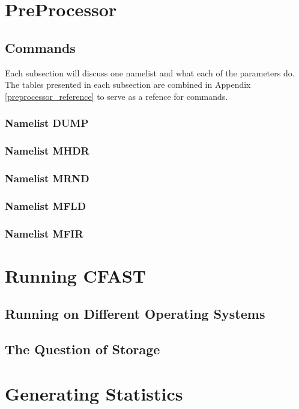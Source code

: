 \documentclass[12pt,twoside]{book}
\begin{document}
\section{PreProcessor}

\subsection{Commands}
\label{commands_section}
Each subsection will discuss one namelist and what each of the parameters do. The tables presented in each subsection are combined in Appendix \ref{preprocessor_reference}  to serve as a refence for commands.

\subsubsection{Namelist DUMP}

\subsubsection{Namelist MHDR}

\subsubsection{Namelist MRND}

\subsubsection{Namelist MFLD}

\subsubsection{Namelist MFIR}

\section{Running CFAST}

\subsection{Running on Different Operating Systems}

\subsection{The Question of Storage}

\section{Generating Statistics}
\end{document}
